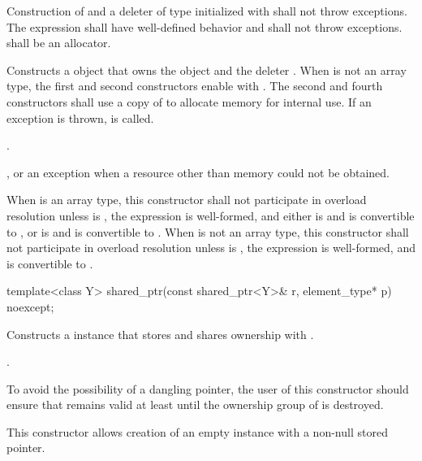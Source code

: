 \begin{itemdescr}
\pnum\requires Construction of  and a deleter of type 
initialized with  shall not throw exceptions.
The expression 
shall have well-defined behavior and shall not throw exceptions.
 shall be an allocator.

\pnum\effects  Constructs a  object that owns the
object  and the deleter .
When  is not an array type,
the first and second constructors enable  with .
The second and fourth constructors shall use a copy of  to
allocate memory for internal use.
If an exception is thrown,  is called.

\pnum\postconditions  {}.

\pnum\throws  {}, or an  exception
when a resource other than memory could not be obtained.

\pnum\remarks
When  is an array type,
this constructor shall not participate in overload resolution unless
 is ,
the expression  is well-formed, and either
 is  and  is convertible to , or
 is  and  is convertible to .
When  is not an array type,
this constructor shall not participate in overload resolution unless
 is ,
the expression  is well-formed, and
 is convertible to .
\end{itemdescr}

%
\begin{itemdecl}
template<class Y> shared_ptr(const shared_ptr<Y>& r, element_type* p) noexcept;
\end{itemdecl}

\begin{itemdescr}
\pnum
\effects Constructs a  instance that
stores  and shares ownership with .

\pnum
\postconditions {}.

\pnum
\begin{note} To avoid the possibility of a dangling pointer, the
user of this constructor should ensure that  remains valid at
least until the ownership group of  is destroyed. \end{note}

\pnum
\begin{note} This constructor allows creation of an empty
 instance with a non-null stored pointer. \end{note}
\end{itemdescr}

